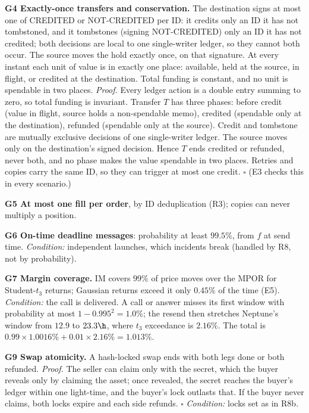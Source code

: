 \textbf{G4 Exactly-once transfers and conservation.} The destination signs at most one of CREDITED or NOT-CREDITED per ID: it credits only an ID it has not tombstoned, and it tombstones (signing NOT-CREDITED) only an ID it has not credited; both decisions are local to one single-writer ledger, so they cannot both occur. The source moves the hold exactly once, on that signature. At every instant each unit of value is in exactly one place: available, held at the source, in flight, or credited at the destination. Total funding is constant, and no unit is spendable in two places. \emph{Proof.} Every ledger action is a double entry summing to zero, so total funding is invariant. Transfer $T$ has three phases: before credit (value in flight, source holds a non-spendable memo), credited (spendable only at the destination), refunded (spendable only at the source). Credit and tombstone are mutually exclusive decisions of one single-writer ledger. The source moves only on the destination's signed decision. Hence $T$ ends credited or refunded, never both, and no phase makes the value spendable in two places. Retries and copies carry the same ID, so they can trigger at most one credit. $\square$ (E3 checks this in every scenario.)

\textbf{G5 At most one fill per order}, by ID deduplication (R3); copies can never multiply a position.

\textbf{G6 On-time deadline messages}: probability at least $99.5\%$, from $f$ at send time. \emph{Condition:} independent launches, which incidents break (handled by R8, not by probability).

\textbf{G7 Margin coverage.} IM covers $99\%$ of price moves over the MPOR for Student-$t_3$ returns; Gaussian returns exceed it only $0.45\%$ of the time (E5). \emph{Condition:} the call is delivered. A call or answer misses its first window with probability at most $1-0.995^2=1.0\%$; the resend then stretches Neptune's window from $12.9$ to $23.3\h$, where $t_3$ exceedance is $2.16\%$. The total is $0.99\times1.0016\%+0.01\times2.16\%=1.013\%$.

\textbf{G9 Swap atomicity.} A hash-locked swap ends with both legs done or both refunded. \emph{Proof.} The seller can claim only with the secret, which the buyer reveals only by claiming the asset; once revealed, the secret reaches the buyer's ledger within one light-time, and the buyer's lock outlasts that. If the buyer never claims, both locks expire and each side refunds. $\square$ \emph{Condition:} locks set as in R8b.

